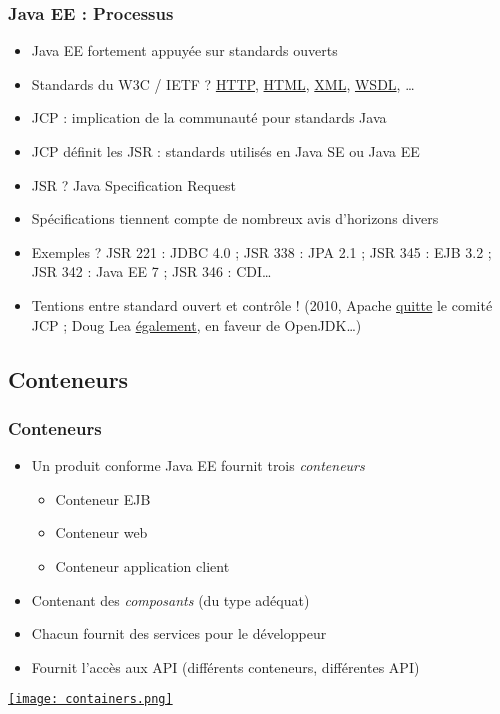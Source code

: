 \documentclass[english, french]{beamer}
\begin{document}
\begin{frame}
	\frametitle{Java EE : Processus}
	\begin{itemize}
		\item Java EE fortement appuyée sur standards ouverts
		\item Standards du W3C / IETF ?\pause{} \href{http://www.w3.org/Protocols/}{HTTP}, \href{http://www.w3.org/html/}{HTML}, \href{http://www.w3.org/XML/}{XML}, \href{http://www.w3.org/TR/wsdl}{WSDL}, …\pause
		\item JCP : implication de \og{}la communauté\fg{} pour standards Java
		\item JCP définit les JSR : standards utilisés en Java SE ou Java EE
		\item JSR ? \pause Java Specification Request \pause
		\item Spécifications tiennent compte de nombreux avis d’horizons divers
		\item Exemples ? \pause JSR 221 : JDBC 4.0 ; JSR 338 : JPA 2.1 ; JSR 345 : EJB 3.2 ; JSR 342 : Java EE 7 ; JSR 346 : CDI… \pause
		\item Tentions entre standard ouvert et contrôle ! (2010, Apache \href{https://blogs.apache.org/foundation/entry/the_asf_resigns_from_the}{quitte} le comité JCP ; Doug Lea \href{http://gee.cs.oswego.edu/dl/html/jcp22oct10.html}{également}, en faveur de OpenJDK…)
	\end{itemize}
\end{frame}

\subsection{Conteneurs}
\begin{frame}
	\frametitle{Conteneurs}
	\begin{itemize}
		\item Un produit conforme Java EE fournit trois \emph{conteneurs}
		\begin{itemize}
			\item Conteneur EJB
			\item Conteneur web
			\item Conteneur application client
		\end{itemize}
		\item Contenant des \emph{composants} (du type adéquat)
		\item Chacun fournit des services pour le développeur
		\item Fournit l’accès aux API (différents conteneurs, différentes API)
	\end{itemize}
	\href{https://docs.oracle.com/javaee/7/tutorial/overview007.htm}{\texttt{[image: containers.png]}}
\end{frame}
\end{document}
